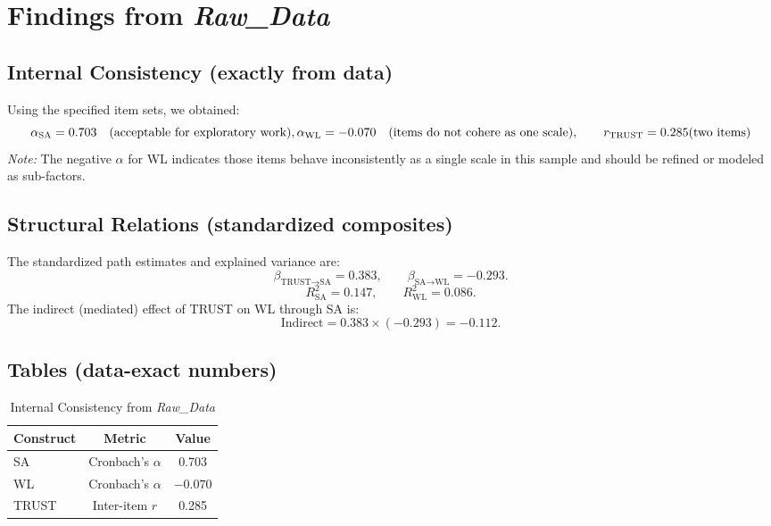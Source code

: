 \documentclass[conference]{IEEEtran}
\begin{document}
\section{Findings from \textit{Raw\_Data}}

\subsection{Internal Consistency (exactly from data)}
Using the specified item sets, we obtained:
\[
\alpha_{\text{SA}} = 0.703 \quad (\text{acceptable for exploratory work}),\\
\alpha_{\text{WL}} = -0.070 \quad (\text{items do not cohere as one scale}),
\qquad
r_{\text{TRUST}} = 0.285 \ \\
(\text{two items})
\]
\textit{Note:} The negative \(\alpha\) for WL indicates those items behave inconsistently as a single scale in this sample and should be refined or modeled as sub-factors.

\subsection{Structural Relations (standardized composites)}
The standardized path estimates and explained variance are:
\[
\beta_{\text{TRUST}\rightarrow\text{SA}} = \mathbf{0.383}, \qquad
\beta_{\text{SA}\rightarrow\text{WL}} = \mathbf{-0.293}.
\]
\[
R^2_{\text{SA}} = \mathbf{0.147}, \qquad
R^2_{\text{WL}} = \mathbf{0.086}.
\]
The indirect (mediated) effect of TRUST on WL through SA is:
\[
\text{Indirect} = 0.383 \times (-0.293) = \mathbf{-0.112}.
\]

\subsection{Tables (data-exact numbers)}
\begin{table}[h]
\centering
\caption{Internal Consistency from \textit{Raw\_Data}}
\begin{tabular}{lcc}
\toprule
Construct & Metric & Value \\
\midrule
SA    & Cronbach's $\alpha$ & 0.703 \\
WL    & Cronbach's $\alpha$ & $-0.070$ \\
TRUST & Inter-item $r$      & 0.285 \\
\bottomrule
\end{tabular}
\end{table}
\end{document}
